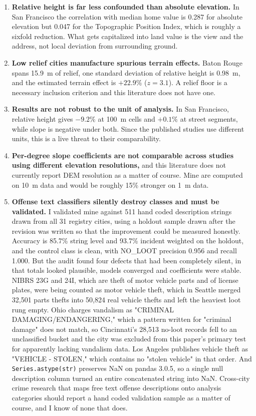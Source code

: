 \documentclass[10pt,letterpaper]{article}
\begin{document}
\begin{enumerate}
\item \textbf{Relative height is far less confounded than absolute elevation.} In San
Francisco the correlation with median home value is 0.287 for absolute elevation but
0.047 for the Topographic Position Index, which is roughly a sixfold reduction. What
gets capitalized into land value is the view and the address, not local deviation from
surrounding ground.

\item \textbf{Low relief cities manufacture spurious terrain effects.} Baton Rouge
spans 15.9~m of relief, one standard deviation of relative height is 0.98~m, and the
estimated terrain effect is $+22.9\%$ ($z = 3.1$). A relief floor is a necessary
inclusion criterion and this literature does not have one.

\item \textbf{Results are not robust to the unit of analysis.} In San Francisco,
relative height gives $-9.2\%$ at 100~m cells and $+0.1\%$ at street segments, while
slope is negative under both. Since the published studies use different units, this is
a live threat to their comparability.

\item \textbf{Per-degree slope coefficients are not comparable across studies using
different elevation resolutions,} and this literature does not currently report DEM
resolution as a matter of course. Mine are computed on 10~m data and would be roughly
15\% stronger on 1~m data.

\item \textbf{Offense text classifiers silently destroy classes and must be
validated.} I validated mine against 511 hand coded description strings drawn from all
31 registry cities, using a holdout sample drawn after the revision was written so
that the improvement could be measured honestly. Accuracy is 85.7\% string level and
93.7\% incident weighted on the holdout, and the control class is clean, with NO\_LOOT
precision 0.956 and recall 1.000. But the audit found four defects that had been
completely silent, in that totals looked plausible, models converged and coefficients
were stable. NIBRS 23G and 24I, which are theft of motor vehicle parts and of license
plates, were being counted as motor vehicle theft, which in Seattle merged 32,501
parts thefts into 50,824 real vehicle thefts and left the heaviest loot rung empty.
Ohio charges vandalism as "CRIMINAL DAMAGING/ENDANGERING," which a pattern written for
"criminal damage" does not match, so Cincinnati's 28,513 no-loot records fell to an
unclassified bucket and the city was excluded from this paper's primary test for
apparently lacking vandalism data. Los Angeles publishes vehicle theft as
"VEHICLE - STOLEN," which contains no "stolen vehicle" in that order. And
\texttt{Series.astype(str)} preserves NaN on pandas 3.0.5, so a single null
description column turned an entire concatenated string into NaN. Cross-city crime
research that maps free text offense descriptions onto analysis categories should
report a hand coded validation sample as a matter of course, and I know of none that
does.
\end{enumerate}
\end{document}
